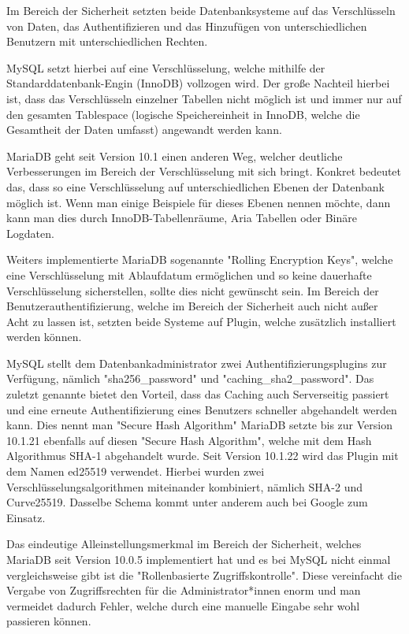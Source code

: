 
Im Bereich der Sicherheit setzten beide Datenbanksysteme auf das Verschlüsseln von Daten, das Authentifizieren und das Hinzufügen von unterschiedlichen Benutzern mit unterschiedlichen Rechten. \cite{MariaVsMy}

MySQL setzt hierbei auf eine Verschlüsselung, welche mithilfe der Standarddatenbank-Engin (InnoDB) vollzogen wird. Der große Nachteil hierbei ist, dass das Verschlüsseln einzelner Tabellen nicht möglich ist und immer nur auf den gesamten Tablespace (logische Speichereinheit in InnoDB, welche die Gesamtheit der Daten umfasst) angewandt werden kann. \cite{MariaVsMy}

MariaDB geht seit Version 10.1 einen anderen Weg, welcher deutliche Verbesserungen im Bereich der Verschlüsselung mit sich bringt. Konkret bedeutet das, dass so eine Verschlüsselung auf unterschiedlichen Ebenen der Datenbank möglich ist. Wenn man einige Beispiele für dieses Ebenen nennen möchte, dann kann man dies durch InnoDB-Tabellenräume, Aria Tabellen oder Binäre Logdaten. \cite{MariaVsMy}

Weiters implementierte MariaDB sogenannte "Rolling Encryption Keys", welche eine Verschlüsselung mit Ablaufdatum ermöglichen und so keine dauerhafte Verschlüsselung sicherstellen, sollte dies nicht gewünscht sein.
Im Bereich der Benutzerauthentifizierung, welche im Bereich der Sicherheit auch nicht außer Acht zu lassen ist, setzten beide Systeme auf Plugin, welche zusätzlich installiert werden können. \cite{MariaVsMy}

MySQL stellt dem Datenbankadministrator zwei Authentifizierungsplugins zur Verfügung, nämlich "sha256\_password" und "caching\_sha2\_password". Das zuletzt genannte bietet den Vorteil, dass das Caching auch Serverseitig passiert und eine erneute Authentifizierung eines Benutzers schneller abgehandelt werden kann. Dies nennt man "Secure Hash Algorithm"
MariaDB setzte bis zur Version 10.1.21 ebenfalls auf diesen "Secure Hash Algorithm", welche mit dem Hash Algorithmus SHA-1 abgehandelt wurde. Seit Version 10.1.22 wird das Plugin mit dem Namen ed25519 verwendet. Hierbei wurden zwei Verschlüsselungsalgorithmen miteinander kombiniert, nämlich SHA-2 und Curve25519. Dasselbe Schema kommt unter anderem auch bei Google zum Einsatz. \cite{MariaVsMy}

Das eindeutige Alleinstellungsmerkmal im Bereich der Sicherheit, welches MariaDB seit Version 10.0.5 implementiert hat und es bei MySQL nicht einmal vergleichsweise gibt ist die "Rollenbasierte Zugriffskontrolle". Diese vereinfacht die Vergabe von Zugriffsrechten für die Administrator*innen enorm und man vermeidet dadurch Fehler, welche durch eine manuelle Eingabe sehr wohl passieren können. \cite{MariaVsMy}


